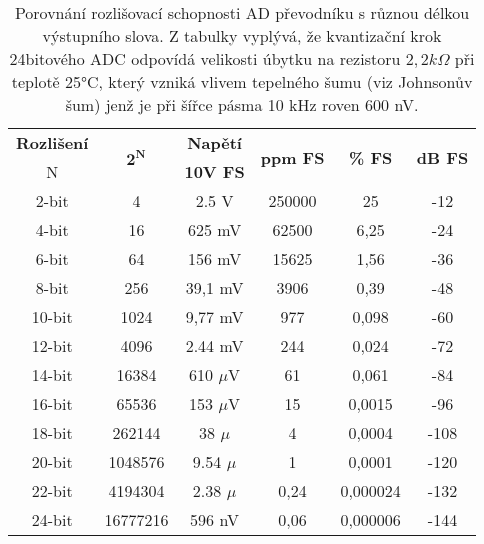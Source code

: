 {         \begin{table*}[ht!]
           \centering
            \setlength{\tabcolsep}{5pt}
            \begin{tabular}{|c|c|c|c|c|c|}
              \hline
                \textbf{Rozlišení} & \multirow{2}{*}{$\mathbf{2^N}$} &  \textbf{Napětí} & 
                \multirow{2}{*}{\textbf{ppm FS}}& \multirow{2}{*}{\textbf{\% FS}}&   
                \multirow{2}{*}{\textbf{dB FS}}                                                 \\
                         N     &           &  \textbf{10V FS} &        &             &          \\
              \hline
                       2-bit   &         4 &            2.5 V & 250000 &          25 &  -12     \\
              \hline
                       4-bit   &        16 &           625 mV &  62500 &        6,25 &  -24     \\
              \hline
                       6-bit   &        64 &           156 mV &  15625 &        1,56 &  -36     \\
              \hline
                       8-bit   &       256 &          39,1 mV &   3906 &        0,39 &  -48     \\
              \hline
                      10-bit   &      1024 &          9,77 mV &    977 &       0,098 &  -60     \\
              \hline
                      12-bit   &      4096 &          2.44 mV &    244 &       0,024 &  -72     \\
              \hline
                      14-bit   &     16384 &       610 $\mu$V &     61 &       0,061 &  -84     \\
              \hline
                      16-bit   &     65536 &       153 $\mu$V &     15 &      0,0015 &  -96     \\
              \hline
                      18-bit   &    262144 &         38 $\mu$ &      4 &      0,0004 & -108     \\
              \hline
                      20-bit   &   1048576 &       9.54 $\mu$ &      1 &      0,0001 & -120     \\
              \hline
                      22-bit   &   4194304 &       2.38 $\mu$ &   0,24 &    0,000024 & -132     \\
              \hline
                      24-bit   &  16777216 &           596 nV &   0,06 &    0,000006 & -144     \\
              \hline
           \end{tabular}
           \caption[Kvantizace: Velikost LSB]{Porovnání rozlišovací schopnosti AD převodníku s  
                    různou délkou výstupního slova. Z tabulky vyplývá, že kvantizační krok 
                    24bitového ADC odpovídá velikosti úbytku na rezistoru $2,2 k\Omega$ při teplotě 
                    25°C, který vzniká vlivem tepelného šumu (viz Johnsonův šum) jenž je při šířce 
                    pásma 10 kHz roven 600 nV. }
           \label{AES:tab_10b_ADC_resolution}
         \end{table*}

}
